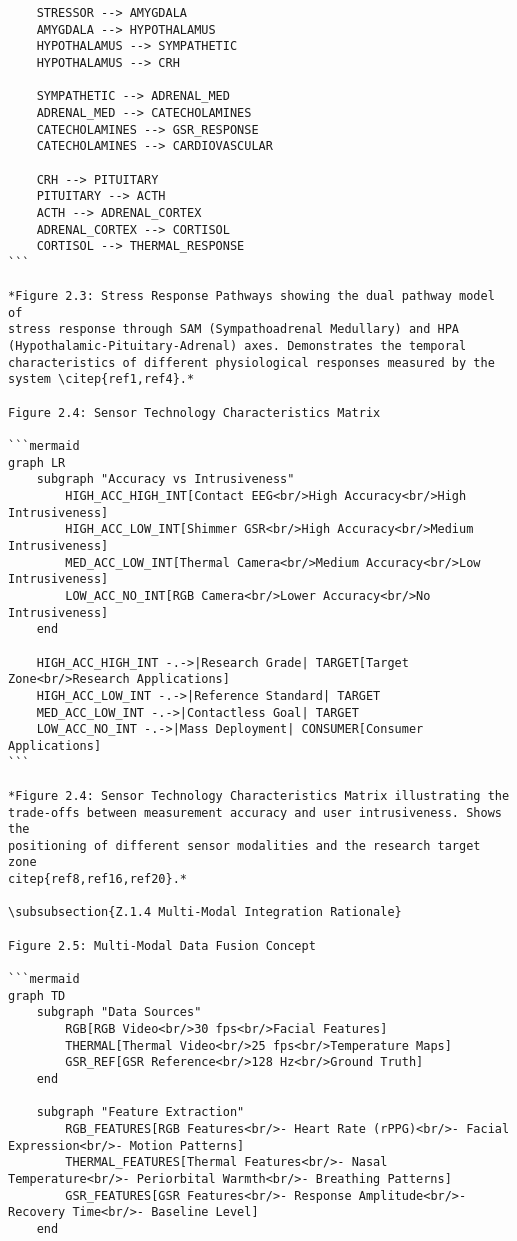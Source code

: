 \begin{verbatim}
    STRESSOR --> AMYGDALA
    AMYGDALA --> HYPOTHALAMUS
    HYPOTHALAMUS --> SYMPATHETIC
    HYPOTHALAMUS --> CRH

    SYMPATHETIC --> ADRENAL_MED
    ADRENAL_MED --> CATECHOLAMINES
    CATECHOLAMINES --> GSR_RESPONSE
    CATECHOLAMINES --> CARDIOVASCULAR

    CRH --> PITUITARY
    PITUITARY --> ACTH
    ACTH --> ADRENAL_CORTEX
    ADRENAL_CORTEX --> CORTISOL
    CORTISOL --> THERMAL_RESPONSE
```

*Figure 2.3: Stress Response Pathways showing the dual pathway model of
stress response through SAM (Sympathoadrenal Medullary) and HPA
(Hypothalamic-Pituitary-Adrenal) axes. Demonstrates the temporal
characteristics of different physiological responses measured by the
system \citep{ref1,ref4}.*

Figure 2.4: Sensor Technology Characteristics Matrix

```mermaid
graph LR
    subgraph "Accuracy vs Intrusiveness"
        HIGH_ACC_HIGH_INT[Contact EEG<br/>High Accuracy<br/>High Intrusiveness]
        HIGH_ACC_LOW_INT[Shimmer GSR<br/>High Accuracy<br/>Medium Intrusiveness]
        MED_ACC_LOW_INT[Thermal Camera<br/>Medium Accuracy<br/>Low Intrusiveness]
        LOW_ACC_NO_INT[RGB Camera<br/>Lower Accuracy<br/>No Intrusiveness]
    end

    HIGH_ACC_HIGH_INT -.->|Research Grade| TARGET[Target Zone<br/>Research Applications]
    HIGH_ACC_LOW_INT -.->|Reference Standard| TARGET
    MED_ACC_LOW_INT -.->|Contactless Goal| TARGET
    LOW_ACC_NO_INT -.->|Mass Deployment| CONSUMER[Consumer Applications]
```

*Figure 2.4: Sensor Technology Characteristics Matrix illustrating the
trade-offs between measurement accuracy and user intrusiveness. Shows the
positioning of different sensor modalities and the research target zone
citep{ref8,ref16,ref20}.*

\subsubsection{Z.1.4 Multi-Modal Integration Rationale}

Figure 2.5: Multi-Modal Data Fusion Concept

```mermaid
graph TD
    subgraph "Data Sources"
        RGB[RGB Video<br/>30 fps<br/>Facial Features]
        THERMAL[Thermal Video<br/>25 fps<br/>Temperature Maps]
        GSR_REF[GSR Reference<br/>128 Hz<br/>Ground Truth]
    end

    subgraph "Feature Extraction"
        RGB_FEATURES[RGB Features<br/>- Heart Rate (rPPG)<br/>- Facial Expression<br/>- Motion Patterns]
        THERMAL_FEATURES[Thermal Features<br/>- Nasal Temperature<br/>- Periorbital Warmth<br/>- Breathing Patterns]
        GSR_FEATURES[GSR Features<br/>- Response Amplitude<br/>- Recovery Time<br/>- Baseline Level]
    end


\end{verbatim}
